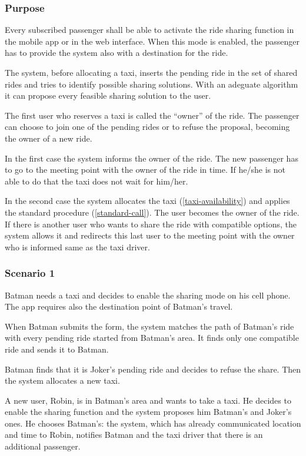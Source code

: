 \label{ride-sharing}
\subsubsection{Purpose}

Every subscribed passenger shall be able to activate the ride sharing function in the mobile app or in the web interface. When this mode is enabled, the passenger has to provide the system also with a destination for the ride.

The system, before allocating a taxi, inserts the pending ride in the set of shared rides and tries to identify possible sharing solutions.
With an adeguate algorithm it can propose every feasible sharing solution to the user.

The first user who reserves a taxi is called the ``owner'' of the ride.
The passenger can choose to join one of the pending rides or to refuse the proposal, becoming the owner of a new ride.

In the first case the system informs the owner of the ride. The new passenger has to go to the meeting point with the owner of the ride in time. If he/she is not able to do that the taxi does not wait for him/her.

In the second case the system allocates the taxi (\ref{taxi-availability}) and applies the standard procedure (\ref{standard-call}).  The user becomes the owner of the ride.
If there is another user who wants to share the ride with compatible options, the system allows it and redirects this last user to the meeting point with the owner who is informed same as the taxi driver.

\subsubsection{Scenario 1}
Batman needs a taxi and decides to enable the sharing mode on his cell phone. The app requires also the destination point of Batman's travel.

When Batman submits the form, the system matches the path of Batman's ride with every pending ride started from Batman's area. It finds only one compatible ride and sends it to Batman.

Batman finds that it is Joker's pending ride and decides to refuse the share. Then the system allocates a new taxi.

A new user, Robin, is in Batman's area and wants to take a taxi. He decides to enable the sharing function and the system proposes him Batman's and Joker's ones. He chooses Batman's: the system, which has already communicated location and time to Robin, notifies Batman and the taxi driver that there is an additional passenger.

